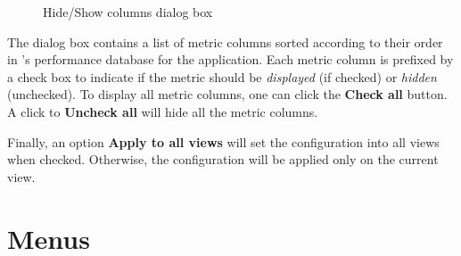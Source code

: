 \begin{itemize}
\begin{figure}[t]
\caption{Hide/Show columns dialog box}
\label{fig:hpcviewer-hide-show-columns}
\end{figure}

The dialog box contains a list of metric columns sorted according to their order in \HPCToolkit{}'s performance database for the application. Each metric column is prefixed by a check box to indicate if the metric should be \textit{displayed} (if checked) or \textit{hidden} (unchecked). To display all metric columns, one can click the \textbf{Check all} button. A click to \textbf{Uncheck all} will hide all the metric columns.

Finally, an option \textbf{Apply to all views} will set the configuration into all views when checked.
Otherwise, the configuration will be applied only on the current view.

\end{itemize}



\section{Menus}

